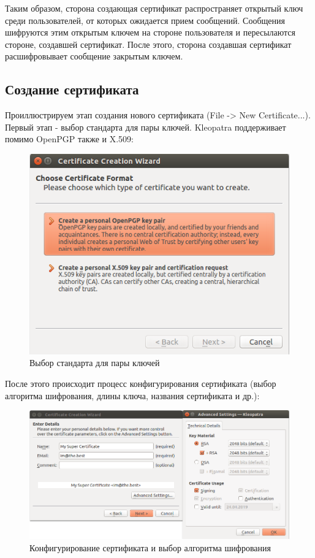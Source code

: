 \documentclass[14pt,a4paper,report]{report}
\begin{document}
Таким образом, сторона создающая сертификат распространяет открытый ключ среди пользователей, от которых ожидается прием сообщений. Сообщения шифруются этим открытым ключем на стороне пользователя и пересылаются стороне, создавшей сертификат. После этого, сторона создавшая сертификат расшифровывает сообщение закрытым ключем.

\subsection{Создание сертификата}

Проиллюстрируем этап создания нового сертификата (File -> New Certificate...). Первый этап - выбор стандарта для пары ключей. Kleopatra поддерживает помимо OpenPGP также и X.509: 

\begin{figure}[h!]
	\centering
	\includegraphics[scale = 0.68]{images/1_1.png}
	
	\caption{Выбор стандарта для пары ключей}
	\label{image:1}
\end{figure}

После этого происходит процесс конфигурирования сертификата (выбор алгоритма шифрования, длины ключа, названия сертификата и др.):

\begin{figure}[h!]
	\centering
	\includegraphics[scale = 0.68]{images/1_2.png}
	
	\caption{Конфигурирование сертификата и выбор алгоритма шифрования}
	\label{image:2}
\end{figure}
\end{document}
